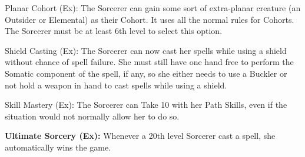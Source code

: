 \begin{description*}
\item[Planar Cohort (Ex):] The Sorcerer can gain some sort of extra-planar creature (an Outsider or Elemental) as their Cohort. It uses all the normal rules for Cohorts. The Sorcerer must be at least 6th level to select this option.

\item[Shield Casting (Ex):] The Sorcerer can now cast her spells while using a shield without chance of spell failure. She must still have one hand free to perform the Somatic component of the spell, if any, so she either needs to use a Buckler or not hold a weapon in hand to cast spells while using a shield.

\item[Skill Mastery (Ex):] The Sorcerer can Take 10 with her Path Skills, even if the situation would not normally allow her to do so.

\end{description*}

\textbf{Ultimate Sorcery (Ex):} Whenever a 20th level Sorcerer cast a spell, she automatically wins the game.
